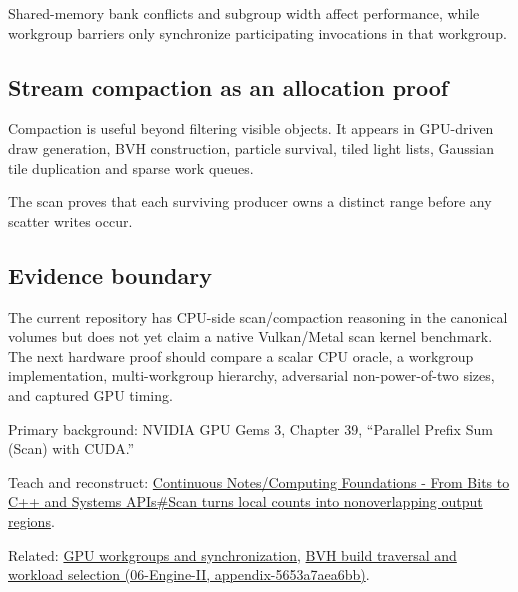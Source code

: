 Shared-memory bank conflicts and subgroup width affect performance, while workgroup barriers only synchronize participating invocations in that workgroup.

\subsection{Stream compaction as an allocation proof}\label{appendix-f2ee4d086415-stream-compaction-as-an-allocation-proof}

Compaction is useful beyond filtering visible objects. It appears in GPU-driven draw generation, BVH construction, particle survival, tiled light lists, Gaussian tile duplication and sparse work queues.

The scan proves that each surviving producer owns a distinct range before any scatter writes occur.

\subsection{Evidence boundary}\label{appendix-f2ee4d086415-evidence-boundary}

The current repository has CPU-side scan/compaction reasoning in the canonical volumes but does not yet claim a native Vulkan/Metal scan kernel benchmark. The next hardware proof should compare a scalar CPU oracle, a workgroup implementation, multi-workgroup hierarchy, adversarial non-power-of-two sizes, and captured GPU timing.

Primary background: NVIDIA GPU Gems 3, Chapter 39, ``Parallel Prefix Sum (Scan) with CUDA.''

Teach and reconstruct: \hyperref[01-foundations-i-ch008-scan-turns-local-counts-into-nonoverlapping-output-regions]{Continuous Notes/Computing Foundations - From Bits to C++ and Systems APIs\#Scan turns local counts into nonoverlapping output regions}.

Related: \hyperref[appendix-f662b5b1773b]{GPU workgroups and synchronization}, \href{../06-Engine-II/main.pdf\#nameddest=appendix-5653a7aea6bb}{BVH build traversal and workload selection (06-Engine-II, appendix-5653a7aea6bb)}.
